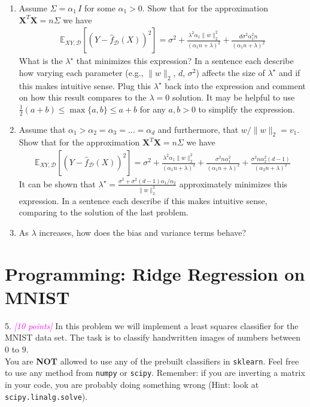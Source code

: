 \documentclass{article}
\newcommand{\1}{\mathbf{1}}
\def\E{\mathbb{E}}
\newcommand{\mb}[1]{\mathbf{#1}}
\newcommand{\mc}[1]{\mathcal{#1}}
\newcommand{\grade}[1]{\small\textcolor{magenta}{\emph{[#1 points]}} \normalsize}
\begin{document}
\begin{enumerate}
    \item Assume $\Sigma= \alpha_1 \, I$ for some $\alpha_1 >0$. Show that for the approximation $\mb{X}^T \mb{X} = n \Sigma$ we have
    \begin{align*}
    \E_{XY,\mc{D}}[ (Y-\widehat{f}_{\mc{D}}(X))^2] = \sigma^2 + \frac{\lambda^2 \alpha_1 \|w\|_2^2}{(\alpha_1 n+\lambda)^2} + \frac{d \sigma^2 \alpha_1^2 n}{(\alpha_1 n + \lambda)^2}
    \end{align*}
    What is the $\lambda^\star$ that minimizes this expression? 
    In a sentence each describe how varying each parameter (e.g., $\|w\|_2$, $d$, $\sigma^2$) affects the size of $\lambda^\star$ and if this makes intuitive sense.
    Plug this $\lambda^\star$ back into the expression and comment on how this result compares to the $\lambda=0$ solution. It may be helpful to use $\tfrac{1}{2}(a+b) \leq \max\{a,b\} \leq a+b$ for any $a,b>0$ to simplify the expression.  
    \item Assume that $\alpha_1 > \alpha_2 = \alpha_3 = \dots = \alpha_d$ and furthermore, that $w/\|w\|_2 = v_1$. Show that for the approximation $\mb{X}^T \mb{X} = n \Sigma$ we have
    \begin{align*}
    \E_{XY,\mc{D}}[ (Y-\widehat{f}_{\mc{D}}(X))^2] = \sigma^2 + \frac{\lambda^2 \alpha_1 \|w\|_2^2}{(\alpha_1 n+\lambda)^2} + \frac{\sigma^2 n \alpha_1^2}{(\alpha_1 n + \lambda)^2} + \frac{\sigma^2 n \alpha_2^2 (d-1)}{(\alpha_2 n + \lambda)^2}
    \end{align*}
    It can be shown that $\lambda^\star = \frac{\sigma^2 + \sigma^2(d-1)\alpha_1/\alpha_2}{\|w\|_2^2}$ approximately minimizes this expression. 
    In a sentence each describe if this makes intuitive sense, comparing to the solution of the last problem.
    \item As $\lambda$ increases, how does the bias and variance terms behave?
     
\end{enumerate}


\section{Programming: Ridge Regression on MNIST}
5. \grade{10} In this problem we will implement a least squares classifier for the MNIST data set. The task
is to classify handwritten images of numbers between $0$ to $9$.\\

You are \textbf{NOT} allowed to use
any of the prebuilt  classifiers in \verb|sklearn|.  Feel free to use any method from \verb|numpy|
or \verb|scipy|. Remember: if you are inverting a matrix in your code, you are probably doing something wrong (Hint: look at \verb|scipy.linalg.solve|).\\
\end{document}
